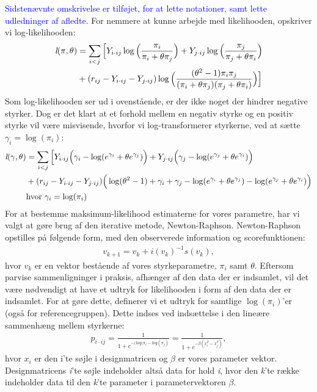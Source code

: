\documentclass[11pt,a4paper]{article}
\begin{document}
\textcolor{blue}{Sidstenævnte omskrivelse er tilføjet, for at lette notationer, samt lette udledninger af afledte.}
For nemmere at kunne arbejde med likelihooden, opskriver vi log-likelihooden: 
\begin{align*}
\textit{l}(\pi,\theta)
&=\sum_{i<j}\Big{[}Y_{i\cdot ij}\log\Big{(}\frac{\pi_i}{\pi_i+\theta\pi_j}\Big{)}
+ Y_{j\cdot ij}\log\Big{(}\frac{\pi_j}{\pi_j+\theta\pi_i}\Big{)}\\
&+ (r_{ij}-Y_{i\cdot ij}-Y_{j\cdot ij}) \log\Big{(}\frac{(\theta^2-1)\pi_i \pi_j}{(\pi_i+\theta\pi_j)(\pi_j+\theta\pi_i)}\Big{)}\Big{]}
\end{align*}
Som log-likelihooden ser ud i ovenstående, er der ikke noget der hindrer negative styrker. Dog er det klart at et forhold mellem en negativ styrke og en positiv styrke vil være misvisende, hvorfor vi log-transformerer styrkerne, ved at sætte $\gamma_i=\log(\pi_i)$:\\
\begin{align*}
\textit{l}(\gamma,\theta)
&=\sum_{i<j}\Big{[}Y_{i\cdot ij}\Big{(}\gamma_i-\log(e^{\gamma_i}+\theta e^{\gamma_j})\Big{)}
+Y_{j\cdot ij}\Big{(}\gamma_j-\log(e^{\gamma_j}+\theta e^{\gamma_i})\Big{)}\\
& +(r_{ij}-Y_{i\cdot ij}-Y_{j\cdot ij}) \Big{(} \log(\theta^2-1)+\gamma_i+\gamma_j-\log(e^{\gamma_i}+\theta e^{\gamma_j})-\log(e^{\gamma_j}+\theta e^{\gamma_i})\Big{)}\\
&\text{hvor }\gamma_i=\log (\pi_i)
\end{align*}
For at bestemme maksimum-likelihood estimaterne for vores parametre, har vi valgt at gøre brug af den iterative metode, Newton-Raphson. Newton-Raphson opstilles på følgende form, med den observerede information og scorefunktionen:
\begin{align*}
v_{k+1} = v_{k} + \textit{i}(v_{k})^{-1}\textit{s}(v_{k}),
\end{align*}
hvor $v_{k}$ er en vektor bestående af vores styrkeparametre, $\pi_i$ samt $\theta$. Eftersom parvise sammenligninger i praksis, afhænger af den data der er indsamlet, vil det være nødvendigt at have et udtryk for likelihooden i form af den data der er indsamlet. For at gøre dette, definerer vi et udtryk for samtlige $\log( \pi_i)$'er (også for referencegruppen). Dette indses ved indsættelse i den lineære sammenhæng mellem styrkerne:
\begin{align*}
    p_{i\cdot ij} = \frac{1}{1+ e^{-(log(\pi_i-log(\pi_j)}} = \frac{1}{1+ e^{-\beta(x_i^T-x_j^T)}},
\end{align*}
hvor $x_i$ er den i'te søjle i designmatricen og $\beta$ er vores parameter vektor. Designmatricens \textit{i}'te søjle indeholder altså data for hold \textit{i}, hvor den \textit{k}'te række indeholder data til den \textit{k}'te parameter i parametervektoren $\beta$. \\
\end{document}

